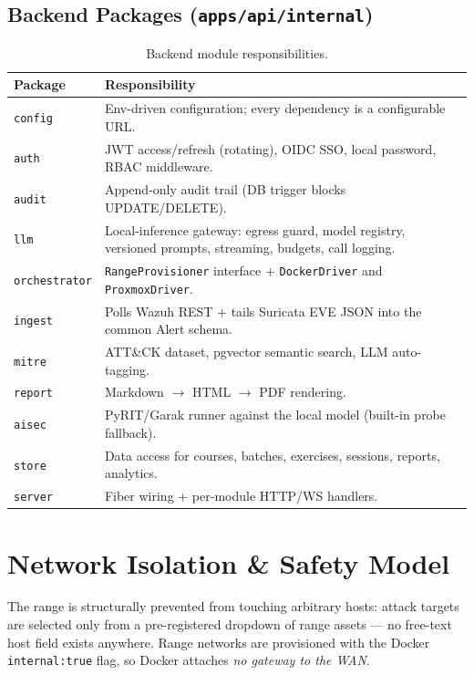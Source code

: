 \documentclass[11pt,a4paper]{article}
\begin{document}
\subsection{Backend Packages (\texttt{apps/api/internal})}
\begin{table}[h]
\centering
\small
\begin{tabular}{@{}ll@{}}
\toprule
\textbf{Package} & \textbf{Responsibility}\\
\midrule
\texttt{config} & Env-driven configuration; every dependency is a configurable URL.\\
\texttt{auth} & JWT access/refresh (rotating), OIDC SSO, local password, RBAC middleware.\\
\texttt{audit} & Append-only audit trail (DB trigger blocks UPDATE/DELETE).\\
\texttt{llm} & Local-inference gateway: egress guard, model registry, versioned prompts, streaming, budgets, call logging.\\
\texttt{orchestrator} & \texttt{RangeProvisioner} interface + \texttt{DockerDriver} and \texttt{ProxmoxDriver}.\\
\texttt{ingest} & Polls Wazuh REST + tails Suricata EVE JSON into the common Alert schema.\\
\texttt{mitre} & ATT\&CK dataset, pgvector semantic search, LLM auto-tagging.\\
\texttt{report} & Markdown $\rightarrow$ HTML $\rightarrow$ PDF rendering.\\
\texttt{aisec} & PyRIT/Garak runner against the local model (built-in probe fallback).\\
\texttt{store} & Data access for courses, batches, exercises, sessions, reports, analytics.\\
\texttt{server} & Fiber wiring + per-module HTTP/WS handlers.\\
\bottomrule
\end{tabular}
\caption{Backend module responsibilities.}
\end{table}

\section{Network Isolation \& Safety Model}
The range is structurally prevented from touching arbitrary hosts: attack
targets are selected only from a pre-registered dropdown of range assets --- no
free-text host field exists anywhere. Range networks are provisioned with the
Docker \texttt{internal:true} flag, so Docker attaches \emph{no gateway to the
WAN}.
\end{document}
